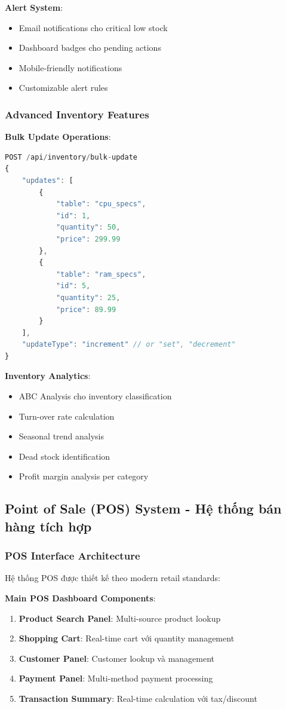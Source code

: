 \documentclass[12pt,a4paper]{article}
\begin{document}
\textbf{Alert System}:
\begin{itemize}
    \item Email notifications cho critical low stock
    \item Dashboard badges cho pending actions
    \item Mobile-friendly notifications
    \item Customizable alert rules
\end{itemize}

\subsubsection{Advanced Inventory Features}
\textbf{Bulk Update Operations}:
\begin{lstlisting}[language=javascript, caption=Bulk Update API Example]
POST /api/inventory/bulk-update
{
    "updates": [
        {
            "table": "cpu_specs",
            "id": 1,
            "quantity": 50,
            "price": 299.99
        },
        {
            "table": "ram_specs", 
            "id": 5,
            "quantity": 25,
            "price": 89.99
        }
    ],
    "updateType": "increment" // or "set", "decrement"
}
\end{lstlisting}

\textbf{Inventory Analytics}:
\begin{itemize}
    \item ABC Analysis cho inventory classification
    \item Turn-over rate calculation
    \item Seasonal trend analysis
    \item Dead stock identification
    \item Profit margin analysis per category
\end{itemize}

\subsection{Point of Sale (POS) System - Hệ thống bán hàng tích hợp}
\subsubsection{POS Interface Architecture}
Hệ thống POS được thiết kế theo modern retail standards:

\textbf{Main POS Dashboard Components}:
\begin{enumerate}
    \item \textbf{Product Search Panel}: Multi-source product lookup
    \item \textbf{Shopping Cart}: Real-time cart với quantity management
    \item \textbf{Customer Panel}: Customer lookup và management
    \item \textbf{Payment Panel}: Multi-method payment processing
    \item \textbf{Transaction Summary}: Real-time calculation với tax/discount
\end{enumerate}
\end{document}
